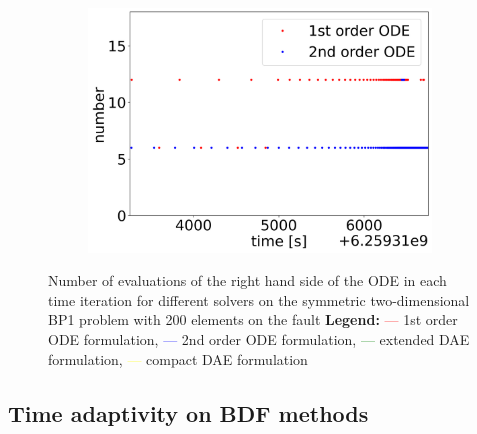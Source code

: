 \begin{figure}[H]
\begin{subfigure}{0.32\textwidth}
    	\includegraphics[width=1\textwidth]{images/TANDEMcompareFormulationstimeEvolutionRHSearthquake.png}
    \end{subfigure}
    \caption{Number of evaluations of the right hand side of the ODE in each time iteration for different solvers on the symmetric two-dimensional BP1 problem with 200 elements on the fault \newline
    \textbf{Legend:} \textcolor{red}{---} 1st order ODE formulation, \textcolor{blue}{---} 2nd order ODE formulation, \textcolor{green}{---} extended DAE formulation, \textcolor{yellow}{---} compact DAE formulation }
    \label{fig:timeEvolutionTANDEM_RHS}
\end{figure}

\subsection{Time adaptivity on BDF methods}

